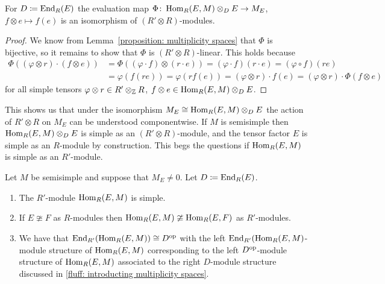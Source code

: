 \begin{lemma}
  For $D \coloneqq \operatorname{End}_R(E)$ the evaluation map $\Phi \colon \operatorname{Hom}_R(E,M) \otimes_D E \to M_E$, $f \otimes e \mapsto f(e)$ is an isomorphism of $(R' \otimes R)$-modules.
\end{lemma}


\begin{proof}
  We know from Lemma~\ref{proposition: multiplicity spaces} that $\Phi$ is bijective, so it remains to show that $\Phi$ is $(R' \otimes R)$-linear.
  This holds because
  \begin{align*}
        \Phi((\varphi \otimes r) \cdot (f \otimes e))
    &=  \Phi((\varphi \cdot f) \otimes (r \cdot e))
     =  (\varphi \cdot f)(r \cdot e)
     =  (\varphi \circ f)(re) \\
    &=  \varphi(f(re))
     =  \varphi(rf(e))
     =  (\varphi \otimes r) \cdot f(e)
     =  (\varphi \otimes r) \cdot \Phi(f \otimes e)
  \end{align*}
  for all simple tensors $\varphi \otimes r \in R' \otimes_{\mathbb{Z}} R$, $f \otimes e \in \operatorname{Hom}_R(E,M) \otimes_D E$.
\end{proof}


\begin{fluff}
  This shows us that under the isomorphism $M_E \cong \operatorname{Hom}_R(E,M) \otimes_D E$ the action of $R' \otimes R$ on $M_E$ can be understood componentwise.
  If $M$ is semisimple then $\operatorname{Hom}_R(E,M) \otimes_D E$ is simple as an $(R' \otimes R)$-module, and the tensor factor $E$ is simple as an $R$-module by construction.
  This begs the questions if $\operatorname{Hom}_R(E,M)$ is simple as an $R'$-module.
\end{fluff}


\begin{lemma}
  Let $M$ be semisimple and suppose that $M_E \neq 0$.
  Let $D \coloneqq \operatorname{End}_R(E)$.
  \begin{enumerate}
    \item
      The $R'$-module $\operatorname{Hom}_R(E,M)$ is simple.
    \item
      If $E \ncong F$ as $R$-modules then $\operatorname{Hom}_R(E,M) \ncong \operatorname{Hom}_R(E,F)$ as $R'$-modules.
    \item
      We have that $\operatorname{End}_{R'}( \operatorname{Hom}_R(E,M) ) \cong D^{\operatorname{op}}$ with the left $\operatorname{End}_{R'}( \operatorname{Hom}_R(E,M)$-module structure of $\operatorname{Hom}_R(E,M)$ corresponding to the left $D^{\operatorname{op}}$-module structure of $\operatorname{Hom}_R(E,M)$ associated to the right $D$-module structure discussed in \ref{fluff: introducting multiplicity spaces}.
  \end{enumerate}
\end{lemma}


